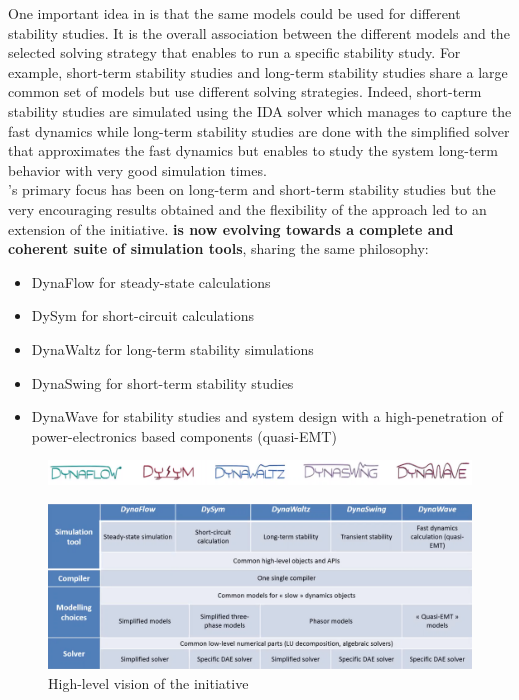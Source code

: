 \documentclass[a4paper, 12pt]{report}
\begin{document}
One important idea in \Dynawo is that the same models could be used for different stability studies. It is the overall association between the different models and the selected solving strategy that enables to run a specific stability study. For example, short-term stability studies and long-term stability studies share a large common set of models but use different solving strategies. Indeed, short-term stability studies are simulated using the \ac{IDA} solver which manages to capture the fast dynamics while long-term stability studies are done with the simplified solver that approximates the fast dynamics but enables to study the system long-term behavior with very good simulation times.  \\

\Dynawo 's primary focus has been on long-term and short-term stability studies but the very encouraging results obtained and the flexibility of the approach led to an extension of the initiative. \textbf{\Dynawo is now evolving towards a complete and coherent suite of simulation tools}, sharing the same philosophy:
\begin{itemize}
\item DynaFlow for steady-state calculations
\item DySym for short-circuit calculations
\item DynaWaltz for long-term stability simulations
\item DynaSwing for short-term stability studies
\item DynaWave for stability studies and system design with a high-penetration of power-electronics based components (quasi-EMT)
\end{itemize}

\begin{figure}[H]
\includegraphics[width=\textwidth]{../resources/DynawoLogos.png}
\end{figure}

\begin{figure}[H]
\centering
\includegraphics[width=\textwidth]{../resources/DynawoInitiative.png}
\caption{High-level vision of the \Dynawo initiative}
\end{figure}
\end{document}
